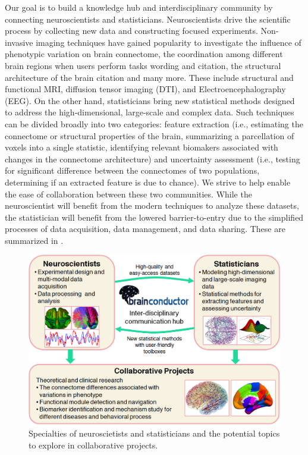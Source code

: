 \documentclass{nature}
\begin{document}
Our goal is to %
build a knowledge hub and interdisciplinary community by connecting
neuroscientists and statisticians.  Neuroscientists
drive the scientific process by collecting new data and constructing focused
experiments. Non-invasive imaging techniques have gained popularity to
investigate the influence of phenotypic variation
on brain connectome\cite{sporns2005human,sporns2011human},
the coordination among different brain regions when users perform
tasks {\color{red}wording and citation},
the structural architecture of the brain {\color{red}citation} and many more. 
These include structural and functional MRI,
diffusion tensor imaging (DTI), and Electroencephalography
(EEG).
On the other hand, statisticians bring new statistical methods
designed to address the high-dimensional, large-scale and complex
data. Such techniques can be divided broadly into
two categories:
feature extraction (i.e., estimating the connectome or structural 
properties of the brain, summarizing
a parcellation of voxels into a single statistic,
identifying relevant biomakers associated with changes in the connectome architecture)
and uncertainty assessment (i.e., testing for significant difference
between the connectomes of two populations, determining if 
an extracted feature is due to chance).
We strive to help enable the ease of collaboration between these two communities.
While the neuroscientist will benefit from the modern techniques to
analyze these datasets, the statistician
will benefit from the lowered barrier-to-entry
due to the  simplified processes of data acquisition, data management, and data
sharing. These are summarized in .

\begin{figure}[tb]
\centering
\includegraphics[width=400pt]{fig/brainconductor/Brainconductor_overview.png}
\caption{Specialties of neuroscietists and statisticians and the potential
topics to explore in collaborative projects.}
\label{fig:overview}
\end{figure}
\end{document}
